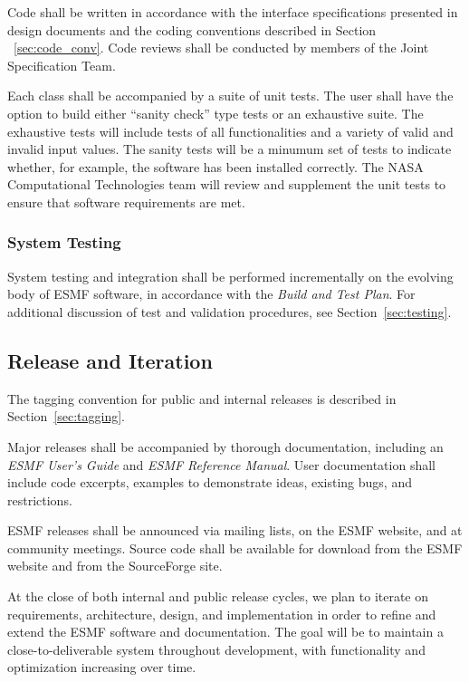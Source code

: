 Code shall be written in accordance with the interface specifications
presented in design documents and the coding conventions described in 
Section ~\ref{sec:code_conv}.  Code reviews shall be conducted by members 
of the Joint Specification Team.

Each class shall be accompanied by a suite of unit tests.  The user
shall have the option to build either ``sanity check'' type tests or an 
exhaustive suite.  The exhaustive tests will include tests of all
functionalities and a variety of valid and invalid input values. The
sanity tests will be a minumum set of tests to indicate whether, for
example, the software has been installed correctly.  The NASA Computational 
Technologies team will review and supplement the unit tests to ensure 
that software requirements are met.

\subsubsection {System Testing }

System testing and integration shall be performed incrementally on the 
evolving body of ESMF software, in accordance with the {\it Build and Test 
Plan}.  For additional discussion
of test and validation procedures, see Section~\ref{sec:testing}.

\subsection {Release and Iteration }

The tagging convention for public and internal releases is
described in Section~\ref{sec:tagging}.

Major releases shall be accompanied by thorough documentation, including an 
{\it ESMF User's Guide} and {\it ESMF Reference Manual}.  User documentation
shall include code excerpts, examples to demonstrate ideas, existing bugs,
and restrictions. 

ESMF releases shall be announced via mailing lists, on the ESMF
website, and at community meetings.  Source code shall be available
for download from the ESMF website and from the SourceForge site.

At the close of both internal and public release cycles, we plan to 
iterate on requirements, architecture, design, and implementation in 
order to refine and extend the ESMF software and documentation.  The
goal will be to maintain a close-to-deliverable system throughout 
development, with functionality and optimization increasing
over time.

